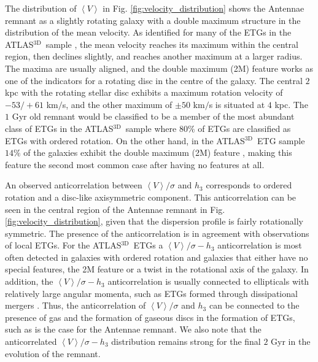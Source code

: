 \documentclass[a4paper,fleqn,usenatbib]{mnras}
\newcommand{\atlas}{\textsc{ATLAS$^\mathrm{3D}$}}
\begin{document}
The distribution of $\left\langle V \right\rangle$ in Fig. \ref{fig:velocity_distribution} shows the Antennae remnant as a slightly rotating galaxy with a 
double maximum structure in the distribution of the mean velocity. As identified for many of the ETGs in the \atlas\ sample
\citep{2011MNRAS.414.2923K}, the mean velocity reaches its maximum within the central region, then declines slightly,
and reaches another maximum at a larger radius. The maxima are usually aligned, and the double maximum (2M) feature 
works as one of the indicators for a rotating disc in the centre of the galaxy.
The central $2$ kpc with the rotating stellar
disc exhibits a maximum rotation velocity of $-53/+61$ km$/$s, and the other maximum of $\pm 50$ km$/$s
is situated at $4$ kpc. The $1$ Gyr old remnant would be classified to be a member of the most 
abundant class of ETGs in the \atlas\ sample where $80\%$
of ETGs are classified as ETGs with ordered rotation. On the other hand, in the \atlas\ ETG sample $14\%$ of the galaxies
exhibit the double maximum (2M) feature \citep{2011MNRAS.414.2923K}, making this feature the second most common case after having 
no features at all.

An observed anticorrelation between $\left\langle V \right\rangle/\sigma$
 and $h_3$ corresponds to ordered rotation 
and a disc-like axisymmetric component. This anticorrelation can be 
seen in the central region of the Antennae remnant in Fig. 
\ref{fig:velocity_distribution}, given that the dispersion profile is fairly rotationally symmetric.
The presence of the anticorrelation is in agreement with observations of local ETGs.
For the \atlas\ ETGs \citep{2011MNRAS.414.2923K} a $\left\langle V \right\rangle/\sigma-h_3$ 
anticorrelation is most often detected in galaxies with ordered rotation and galaxies that either have no special features, 
the 2M feature or a twist in the rotational axis of the galaxy. 
In addition, the $\left\langle V \right\rangle/\sigma-h_3$ anticorrelation is usually 
connected to ellipticals with relatively large angular momenta, such as ETGs formed through dissipational mergers 
\citep{2006MNRAS.372..839N, 2014MNRAS.445.1065R}.
Thus, the anticorrelation of $\left\langle V \right\rangle/\sigma$ and $h_3$ can be connected to the presence of gas and the formation 
of gaseous discs in the formation of ETGs, such as is the case for the Antennae remnant.
We also note that the anticorrelated $\left\langle V \right\rangle/\sigma-h_3$ distribution remains strong for the final $2$ Gyr 
in the evolution of the remnant.
\end{document}
